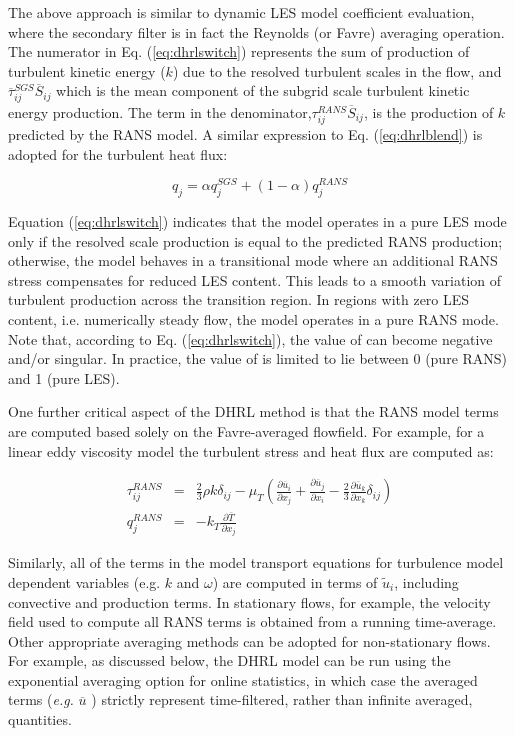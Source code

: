 The above approach is similar to dynamic LES model coefficient
evaluation, where the secondary filter is in fact the Reynolds (or
Favre) averaging operation. The numerator in Eq. (\ref{eq:dhrlswitch})
represents the sum of production of turbulent kinetic energy ($k$) due
to the resolved turbulent scales in the flow, and
$\overline{\tau}^{SGS}_{ij} \overline{S}_{ij}$ which is the mean
component of the subgrid scale turbulent kinetic energy
production. The term in the denominator,$\tau^{RANS}_{ij}
\overline{S}_{ij}$, is the production of $k$ predicted by the RANS
model. A similar expression to Eq. (\ref{eq:dhrlblend}) is adopted for
the turbulent heat flux:

\begin{equation}
q_j = \alpha q^{SGS}_j + (1-\alpha) q^{RANS}_j
\end{equation}

Equation (\ref{eq:dhrlswitch}) indicates that the model operates in a
pure LES mode only if the resolved scale production is equal to the
predicted RANS production; otherwise, the model behaves in a
transitional mode where an additional RANS stress compensates for
reduced LES content. This leads to a smooth variation of turbulent
production across the transition region. In regions with zero LES
content, i.e. numerically steady flow, the model operates in a pure
RANS mode. Note that, according to Eq. (\ref{eq:dhrlswitch}), the
value of can become negative and/or singular. In practice, the value
of is limited to lie between 0 (pure RANS) and 1 (pure LES).

One further critical aspect of the DHRL method is that the RANS model
terms are computed based solely on the Favre-averaged flowfield. For
example, for a linear eddy viscosity model the turbulent stress and
heat flux are computed as:

\begin{eqnarray}
\tau^{RANS}_{ij} &=& \frac{2}{3} \rho k \delta_{ij} - \mu_T \left( \frac{\partial \overline{u}_i}{\partial x_j} + \frac{\partial \overline{u}_j}{\partial x_i} - \frac{2}{3} \frac{\partial \overline{u}_k}{\partial x_k} \delta_{ij}\right)\\
q^{RANS}_j &=& - k_T \frac{\partial \overline{T}}{\partial x_j}
\end{eqnarray}

Similarly, all of the terms in the model transport equations for
turbulence model dependent variables (e.g. $k$ and $\omega$) are
computed in terms of $\tilde{u}_i$, including convective and
production terms. In stationary flows, for example, the velocity field
used to compute all RANS terms is obtained from a running
time-average. Other appropriate averaging methods can be adopted for
non-stationary flows. For example, as discussed below, the DHRL model
can be run using the exponential averaging option for online
statistics, in which case the averaged terms ({\it e.g.}
$\overline{u}$ ) strictly represent time-filtered, rather than
infinite averaged, quantities.

